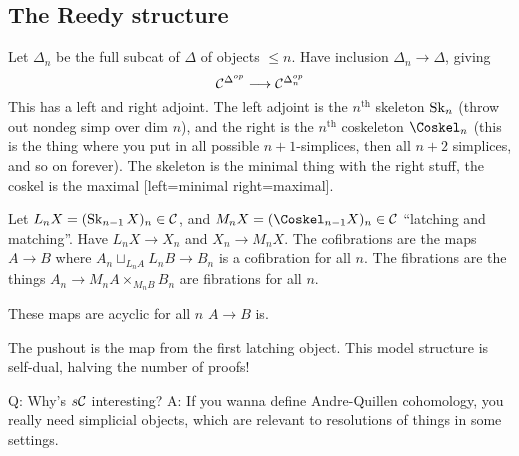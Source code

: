 \documentclass[11pt]{article}
\begin{document}
\begin{InnaSimplicalModelCats}
\subsection*{The Reedy structure}
\begin{defn*} Let $\Delta_n$ be the full subcat of $\Delta$ of objects $\leq n$. Have inclusion $\Delta_n\to\Delta$, giving
\[\mathcal{C}^{\Delta^{op}}\longrightarrow\mathcal{C}^{\Delta^{op}_n}\]
This has a left and right adjoint. The left adjoint is the $n^\text{th}$ skeleton $\operatorname{Sk}_n$ (throw out nondeg simp over dim $n$), and the right is the $n^\text{th}$ coskeleton $\Coskel_n$ (this is the thing where you put in all possible $n+1$-simplices, then all $n+2$ simplices, and so on forever). The skeleton is the minimal thing with the right stuff, the coskel is the maximal [left=minimal right=maximal].

Let $L_nX=(\operatorname{Sk}_{n-1}X)_n\in\mathcal{C}$, and $M_nX=(\Coskel_{n-1}X)_n\in\calC$ ``latching and matching''. Have $L_nX\to X_n$ and $X_n\to M_nX$. The cofibrations are the maps $A\to B$ where $A_n\sqcup_{L_nA}L_nB\to B_n$ is a cofibration for all $n$.
The fibrations are the things $A_n\to M_nA\times_{M_nB}B_n$ are fibrations for all $n$.
\end{defn*}
\begin{cor*}
These maps are acyclic for all $n$ \Iff $A\to B$ is.
\end{cor*}
The pushout is the map from the first latching object. This model structure is self-dual, halving the number of proofs!

Q: Why's $s\mathcal{C}$ interesting?
A: If you wanna define Andre-Quillen cohomology, you really need simplicial objects, which are relevant to resolutions of things in some settings.
\pagebreak
\end{InnaSimplicalModelCats}
\end{document}
